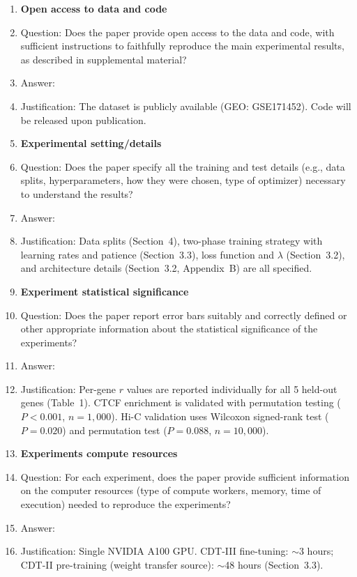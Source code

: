 \documentclass{article}
\begin{document}
\begin{enumerate}
\item {\bf Open access to data and code}
    \item[] Question: Does the paper provide open access to the data and code, with sufficient instructions to faithfully reproduce the main experimental results, as described in supplemental material?
    \item[] Answer: \answerYes{}
    \item[] Justification: The dataset is publicly available (GEO: GSE171452). Code will be released upon publication.

\item {\bf Experimental setting/details}
    \item[] Question: Does the paper specify all the training and test details (e.g., data splits, hyperparameters, how they were chosen, type of optimizer) necessary to understand the results?
    \item[] Answer: \answerYes{}
    \item[] Justification: Data splits (Section~4), two-phase training strategy with learning rates and patience (Section~3.3), loss function and $\lambda$ (Section~3.2), and architecture details (Section~3.2, Appendix~B) are all specified.

\item {\bf Experiment statistical significance}
    \item[] Question: Does the paper report error bars suitably and correctly defined or other appropriate information about the statistical significance of the experiments?
    \item[] Answer: \answerYes{}
    \item[] Justification: Per-gene $r$ values are reported individually for all 5 held-out genes (Table~1). CTCF enrichment is validated with permutation testing ($P < 0.001$, $n = 1{,}000$). Hi-C validation uses Wilcoxon signed-rank test ($P = 0.020$) and permutation test ($P = 0.088$, $n = 10{,}000$).

\item {\bf Experiments compute resources}
    \item[] Question: For each experiment, does the paper provide sufficient information on the computer resources (type of compute workers, memory, time of execution) needed to reproduce the experiments?
    \item[] Answer: \answerYes{}
    \item[] Justification: Single NVIDIA A100 GPU. CDT-III fine-tuning: $\sim$3 hours; CDT-II pre-training (weight transfer source): $\sim$48 hours (Section~3.3).


\end{enumerate}
\end{document}

